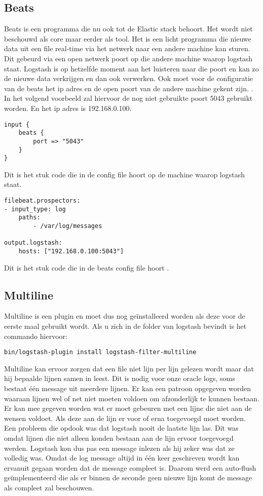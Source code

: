 \subsection{Beats}
\label{subsec:beats}

Beats is een programma die nu ook tot de Elastic stack behoort. Het wordt niet beschouwd als core maar eerder als tool. Het is een licht programma die nieuwe data uit een file real-time via het netwerk naar een andere machine kan sturen. Dit gebeurd via een open netwerk poort op die andere machine waarop logstash staat. Logstash is op hetzelfde moment aan het luisteren naar die poort en kan zo de nieuwe data verkrijgen en dan ook verwerken.
Ook moet voor de configuratie van de beats het ip adres en de open poort van de andere machine gekent zijn. . In het volgend voorbeeld zal hiervoor de nog niet gebruikte poort  5043 gebruikt worden. En het ip adres is 192.168.0.100.
\begin{lstlisting}[frame=single]  
input {
	beats {
		port => "5043"
	}
}

\end{lstlisting}
Dit is het stuk code die in de config file hoort op de machine waarop logstash staat.
\begin{lstlisting}[frame=single]  
filebeat.prospectors:
- input_type: log
	paths:
		- /var/log/messages 
		
output.logstash:
	hosts: ["192.168.0.100:5043"]
\end{lstlisting}
Dit is het stuk code die in de beats config file hoort .


\subsection{Multiline}
\label{subsec:multiline}

Multiline is een plugin en moet dus nog geïnstalleerd worden als deze voor de eerste maal gebruikt wordt. Als u zich in de folder van logstash bevindt is het commando hiervoor:

\begin{lstlisting}[frame=single]  
bin/logstash-plugin install logstash-filter-multiline
\end{lstlisting}

Multiline kan ervoor zorgen dat een file niet lijn per lijn gelezen wordt maar dat hij bepaalde lijnen samen in leest. Dit is nodig voor onze oracle logs, soms bestaat één message uit meerdere lijnen.
Er kan een patroon opgegeven worden waaraan lijnen wel of net niet moeten voldoen om afzonderlijk te kunnen bestaan. Er kan mee gegeven worden wat er moet gebeuren met een lijne die niet aan de wensen voldoet. Als deze aan de lijn er voor of erna toegevoegd moet worden. 
Een probleem die opdook was dat logstash nooit de laatste lijn las. Dit was omdat lijnen die niet alleen konden bestaan aan de lijn ervoor toegevoegd werden. Logstash kon dus pas een message inlezen als hij zeker was dat ze volledig was. Omdat de log message altijd in één keer geschreven wordt kan ervanuit gegaan worden dat de message compleet is. Daarom werd een auto-flush geïmplementeerd die als er binnen de seconde geen nieuwe lijn komt de message als compleet zal beschouwen.

